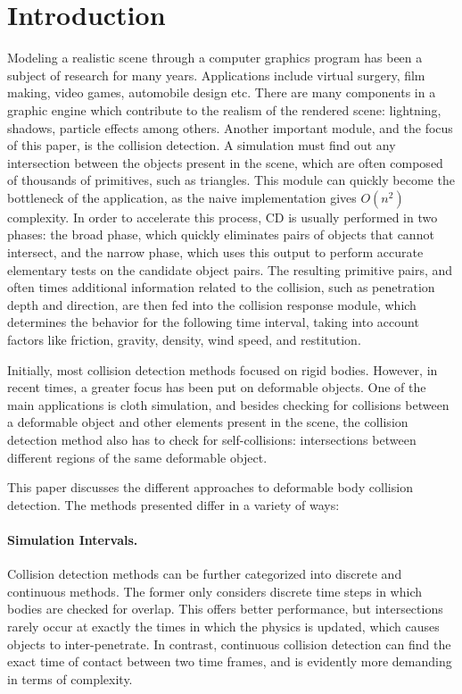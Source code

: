 \section{Introduction}
\label{section:intro}

Modeling a realistic scene through a computer graphics program has been a subject of research for many years. Applications include virtual surgery, film making, video games, automobile design etc. There are many components in a graphic engine which contribute to the realism of the rendered scene: lightning, shadows, particle effects among others. Another important module, and the focus of this paper, is the collision detection. A simulation must find out any intersection between the objects present in the scene, which are often composed of thousands of primitives, such as triangles. This module can quickly become the bottleneck of the application, as the naive implementation gives $O(n^{2})$ complexity. In order to accelerate this process, CD is usually performed in two phases: the broad phase, which quickly eliminates pairs of objects that cannot intersect, and the narrow phase, which uses this output to perform accurate elementary tests on the candidate object pairs. The resulting primitive pairs, and often times additional information related to the collision, such as penetration depth and direction, are then fed into the collision response module, which determines the behavior for the following time interval, taking into account factors like friction, gravity, density, wind speed, and restitution.

Initially, most collision detection methods focused on rigid bodies. However, in recent times, a greater focus has been put on deformable objects. One of the main applications is cloth simulation, and besides checking for collisions between a deformable object and other elements present in the scene, the collision detection method also has to check for self-collisions: intersections between different regions of the same deformable object.

This paper discusses the different approaches to deformable body collision detection. The methods presented differ in a variety of ways:

\paragraph{Simulation Intervals.}

Collision detection methods can be further categorized into discrete and continuous methods. The former only considers discrete time steps in which bodies are checked for overlap. This offers better performance, but intersections rarely occur at exactly the times in which the physics is updated, which causes objects to inter-penetrate. In contrast, continuous collision detection can find the exact time of contact between two time frames, and is evidently more demanding in terms of complexity.

